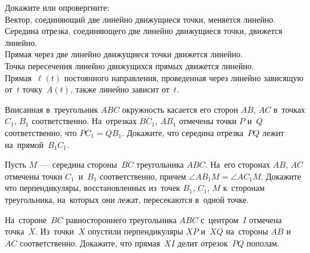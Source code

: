 \begin{problems}



\item
Докажите или опровергните:
\\
\subproblem
Вектор, соединяющий две линейно движущиеся точки, меняется линейно.
\\
\subproblem
Середина отрезка, соединяющего две линейно движущиеся точки, движется линейно.
\\
\subproblem
Прямая через две линейно движущиеся точки движется линейно.
\\
\subproblem
Точка пересечения линейно движущихся прямых движется линейно.
\\
\subproblem
Прямая~$\ell(t)$ постоянного направления, проведенная через линейно зависящую
от~$t$ точку~$A(t)$, также линейно зависит от~$t$.

\item
Вписанная в~треугольник $ABC$ окружность касается его сторон $AB$, $AC$
в~точках $C_1$, $B_1$ соответственно.
На~отрезках $BC_{1}$, $AB_{1}$ отмечены точки $P$ и~$Q$ соответственно, что
$PC_{1} = QB_{1}$.
Докажите, что середина отрезка~$PQ$ лежит на~прямой~$B_{1}C_{1}$.


\item
Пусть $M$~--- середина стороны~$BC$ треугольника $ABC$.
На~его сторонах $AB$, $AC$ отмечены точки $C_1$~и~$B_1$ соответственно, причем
$\angle AB_{1}M = \angle AC_{1}M$.
Докажите что перпендикуляры, восстановленных из~точек $B_1$, $C_1$, $M$
к~сторонам треугольника, на~которых они лежат, пересекаются в~одной точке.

\item
На~стороне~$BC$ равностороннего треугольника $ABC$ с~центром~$I$ отмечена
точка~$X$.
Из~точки~$X$ опустили перпендикуляры $XP$ и~$XQ$ на~стороны $AB$ и~$AC$
соответственно.
Докажите, что прямая~$XI$ делит отрезок~$PQ$ пополам.


\end{problems}
